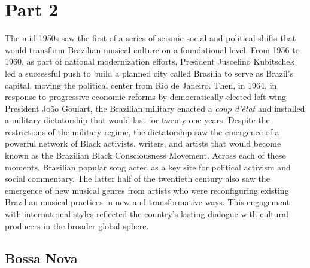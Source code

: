 \documentclass[twoside]{article}
\begin{document}
\section*{Part 2}

The mid-1950s saw the first of a series of seismic social and political
shifts that would transform Brazilian musical culture on a foundational
level. From 1956 to 1960, as part of national modernization efforts,
President Juscelino Kubitschek led a successful push to build a planned
city called Brasília to serve as Brazil's capital, moving the political
center from Rio de Janeiro. Then, in 1964, in response to progressive
economic reforms by democratically-elected left-wing President João
Goulart, the Brazilian military enacted a \emph{coup d'état} and
installed a military dictatorship that would last for twenty-one years.
Despite the restrictions of the military regime, the dictatorship saw
the emergence of a powerful network of Black activists, writers, and
artists that would become known as the Brazilian Black Consciousness
Movement. Across each of these moments, Brazilian popular song acted as
a key site for political activism and social commentary. The latter half
of the twentieth century also saw the emergence of new musical genres
from artists who were reconfiguring existing Brazilian musical practices
in new and transformative ways. This engagement with international
styles reflected the country's lasting dialogue with cultural producers
in the broader global sphere.

\hypertarget{bossa-nova}{%
\subsection*{Bossa Nova}\label{bossa-nova}}
\end{document}
